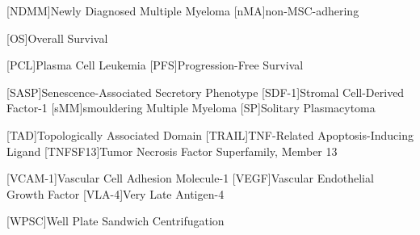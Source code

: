 {\begin{spacing}{-.0}
\begin{acronym}
            [NDMM]{Newly Diagnosed Multiple Myeloma}
            [nMA]{non-MSC-adhering}

            [OS]{Overall Survival}

            [PCL]{Plasma Cell Leukemia}
            [PFS]{Progression-Free Survival}

            [SASP]{Senescence-Associated Secretory Phenotype} %
            [SDF-1]{Stromal Cell-Derived Factor-1}
            [sMM]{smouldering Multiple Myeloma}
            [SP]{Solitary Plasmacytoma}
            
            [TAD]{Topologically Associated Domain}
            [TRAIL]{TNF-Related Apoptosis-Inducing Ligand}
            [TNFSF13]{Tumor Necrosis Factor Superfamily, Member 13}
            
            [VCAM-1]{Vascular Cell Adhesion Molecule-1}
            [VEGF]{Vascular Endothelial Growth Factor}
            [VLA-4]{Very Late Antigen-4}
            
            [WPSC]{Well Plate Sandwich Centrifugation}


        \end{acronym}
    \end{spacing}
}